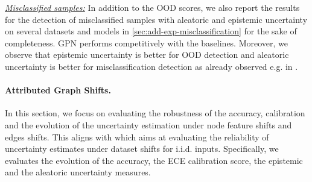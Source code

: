\textit{\underline{Misclassified samples:}} In addition to the OOD scores, we also report the results for the detection of misclassified samples with aleatoric and epistemic uncertainty on several datasets and models in \cref{sec:add-exp-misclassification} for the sake of completeness. GPN performs competitively with the baselines. Moreover, we observe that epistemic uncertainty is better for OOD detection and aleatoric uncertainty is better for misclassification detection as already observed  e.g. in \citep{Zhao2020}.




\paragraph{Attributed Graph Shifts.} In this section, we focus on evaluating the robustness of the accuracy, calibration and the evolution of the uncertainty estimation under node feature shifts and edges shifts. This aligns with \citep{dataset-shift} which aims at evaluating the reliability of uncertainty estimates under dataset shifts for i.i.d. inputs. Specifically, we evaluates the evolution of the accuracy, the ECE \citep{Naeini2015} calibration score, the epistemic and the aleatoric uncertainty measures. 


